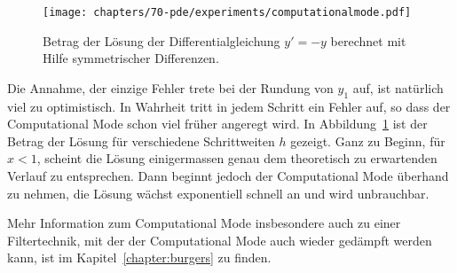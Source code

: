 \begin{figure}
\centering
\texttt{[image: chapters/70-pde/experiments/computationalmode.pdf]}
\caption{Betrag der Lösung der Differentialgleichung $y'=-y$ berechnet
mit Hilfe symmetrischer Differenzen.
\label{buch:pde:cm:fig}}
\end{figure}
Die Annahme, der einzige Fehler trete bei der Rundung von $y_1$ auf,
ist natürlich viel zu optimistisch.
In Wahrheit tritt in jedem Schritt ein Fehler auf, so dass der 
Computational Mode schon viel früher angeregt wird.
In Abbildung~\ref{buch:pde:cm:fig} ist der Betrag der Lösung
für verschiedene Schrittweiten $h$ gezeigt.
Ganz zu Beginn, für $x<1$, scheint die Lösung einigermassen genau dem
theoretisch zu erwartenden Verlauf zu entsprechen.
Dann beginnt jedoch der Computational Mode überhand zu nehmen,
die Lösung wächst exponentiell schnell an und wird unbrauchbar.
%

Mehr Information zum Computational Mode insbesondere auch zu einer
Filtertechnik, mit der der Computational Mode auch wieder gedämpft
werden kann, ist im Kapitel~\ref{chapter:burgers} zu finden.
%
%






